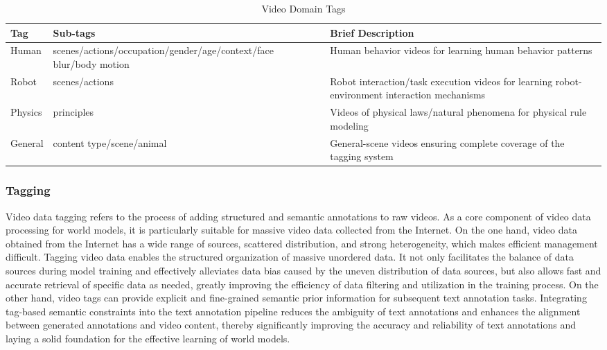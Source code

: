 \documentclass{llmxive}
\providecommand{\arraystretch}{1.3}
\begin{document}
\begin{table}[t]
\centering
\footnotesize %
\renewcommand{\arraystretch}{1.3} %
\begin{tabular}{M{2cm} M{3.5cm} Y}
\toprule
\textbf{Tag} & \textbf{Sub-tags} & \textbf{Brief Description} \\
\midrule
Human & scenes/actions/occupation/\allowbreak gender/age/context/\allowbreak face blur/body motion & Human behavior videos for learning human behavior patterns \\

Robot & scenes/actions & Robot interaction/task execution videos for learning robot-environment interaction mechanisms \\

Physics & principles & Videos of physical laws/natural phenomena for physical rule modeling \\
General & content type/scene/animal & General-scene videos ensuring complete coverage of the tagging system \\


\bottomrule
\end{tabular}
\caption{Video Domain Tags}
\label{tab:video_domain}
\end{table}






\subsubsection{Tagging}
Video data tagging refers to the process of adding structured and semantic annotations to raw videos. As a core component of video data processing for world models, it is particularly suitable for massive video data collected from the Internet.
On the one hand, video data obtained from the Internet has a wide range of sources, scattered distribution, and strong heterogeneity, which makes efficient management difficult. Tagging video data enables the structured organization of massive unordered data. It not only facilitates the balance of data sources during model training and effectively alleviates data bias caused by the uneven distribution of data sources, but also allows fast and accurate retrieval of specific data as needed, greatly improving the efficiency of data filtering and utilization in the training process.
On the other hand, video tags can provide explicit and fine-grained semantic prior information for subsequent text annotation tasks. Integrating tag-based semantic constraints into the text annotation pipeline reduces the ambiguity of text annotations and enhances the alignment between generated annotations and video content, thereby significantly improving the accuracy and reliability of text annotations and laying a solid foundation for the effective learning of world models.
\end{document}
